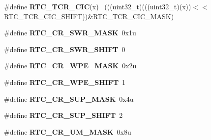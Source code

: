 \begin{DoxyCompactItemize}
\item 
\hypertarget{group___r_t_c___register___masks_ga18cbc5e75c4ab9ec5664b35a8afc9c4f}{}\#define {\bfseries R\+T\+C\+\_\+\+T\+C\+R\+\_\+\+C\+I\+C}(x)                                                  ~(((uint32\+\_\+t)(((uint32\+\_\+t)(x))$<$$<$R\+T\+C\+\_\+\+T\+C\+R\+\_\+\+C\+I\+C\+\_\+\+S\+H\+I\+F\+T))\&R\+T\+C\+\_\+\+T\+C\+R\+\_\+\+C\+I\+C\+\_\+\+M\+A\+S\+K)\label{group___r_t_c___register___masks_ga18cbc5e75c4ab9ec5664b35a8afc9c4f}

\item 
\hypertarget{group___r_t_c___register___masks_ga114a670a6ac2782bd777ea33e4395059}{}\#define {\bfseries R\+T\+C\+\_\+\+C\+R\+\_\+\+S\+W\+R\+\_\+\+M\+A\+S\+K}~0x1u\label{group___r_t_c___register___masks_ga114a670a6ac2782bd777ea33e4395059}

\item 
\hypertarget{group___r_t_c___register___masks_gac0a88898cc6e1686b54a99e3a6fe759d}{}\#define {\bfseries R\+T\+C\+\_\+\+C\+R\+\_\+\+S\+W\+R\+\_\+\+S\+H\+I\+F\+T}~0\label{group___r_t_c___register___masks_gac0a88898cc6e1686b54a99e3a6fe759d}

\item 
\hypertarget{group___r_t_c___register___masks_gade2b0c86902f83d7674c10e3a7923f80}{}\#define {\bfseries R\+T\+C\+\_\+\+C\+R\+\_\+\+W\+P\+E\+\_\+\+M\+A\+S\+K}~0x2u\label{group___r_t_c___register___masks_gade2b0c86902f83d7674c10e3a7923f80}

\item 
\hypertarget{group___r_t_c___register___masks_ga319f4682f30aed777eecac4c09a96223}{}\#define {\bfseries R\+T\+C\+\_\+\+C\+R\+\_\+\+W\+P\+E\+\_\+\+S\+H\+I\+F\+T}~1\label{group___r_t_c___register___masks_ga319f4682f30aed777eecac4c09a96223}

\item 
\hypertarget{group___r_t_c___register___masks_ga762afd0d0e0bbc08b631a10c45222797}{}\#define {\bfseries R\+T\+C\+\_\+\+C\+R\+\_\+\+S\+U\+P\+\_\+\+M\+A\+S\+K}~0x4u\label{group___r_t_c___register___masks_ga762afd0d0e0bbc08b631a10c45222797}

\item 
\hypertarget{group___r_t_c___register___masks_gacf42f5f0dc8f3939de4131b7b63d0dc2}{}\#define {\bfseries R\+T\+C\+\_\+\+C\+R\+\_\+\+S\+U\+P\+\_\+\+S\+H\+I\+F\+T}~2\label{group___r_t_c___register___masks_gacf42f5f0dc8f3939de4131b7b63d0dc2}

\item 
\hypertarget{group___r_t_c___register___masks_gae071fafa245264dd485258198b7fcf8a}{}\#define {\bfseries R\+T\+C\+\_\+\+C\+R\+\_\+\+U\+M\+\_\+\+M\+A\+S\+K}~0x8u\label{group___r_t_c___register___masks_gae071fafa245264dd485258198b7fcf8a}


\end{DoxyCompactItemize}
